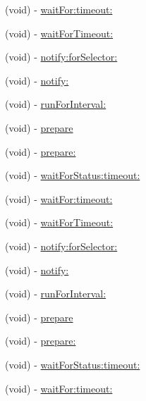 \begin{DoxyCompactItemize}
\item 
(void) -\/ \hyperlink{interface_g_h_async_test_case_a43422127c8303a93f0ae39c883a2da06}{wait\-For\-:timeout\-:}
\item 
(void) -\/ \hyperlink{interface_g_h_async_test_case_aaf22dd45b3493e110362392cc3dc086b}{wait\-For\-Timeout\-:}
\item 
(void) -\/ \hyperlink{interface_g_h_async_test_case_ab1be43eb4f4909ce5607b51fa0a1f40b}{notify\-:for\-Selector\-:}
\item 
(void) -\/ \hyperlink{interface_g_h_async_test_case_ad21d6cdd1f2a284ee7b5ad5b6d1c82e2}{notify\-:}
\item 
(void) -\/ \hyperlink{interface_g_h_async_test_case_accbc972d3d516d1e53529c84fa2fc510}{run\-For\-Interval\-:}
\item 
(void) -\/ \hyperlink{interface_g_h_async_test_case_a8eda5b64c599e0c48bbd206840bd4cde}{prepare}
\item 
(void) -\/ \hyperlink{interface_g_h_async_test_case_a085b47a16f4a790d77ba78bd2eafb3ff}{prepare\-:}
\item 
(void) -\/ \hyperlink{interface_g_h_async_test_case_ae8781529003ebef3a06569c0157687ae}{wait\-For\-Status\-:timeout\-:}
\item 
(void) -\/ \hyperlink{interface_g_h_async_test_case_a43422127c8303a93f0ae39c883a2da06}{wait\-For\-:timeout\-:}
\item 
(void) -\/ \hyperlink{interface_g_h_async_test_case_aaf22dd45b3493e110362392cc3dc086b}{wait\-For\-Timeout\-:}
\item 
(void) -\/ \hyperlink{interface_g_h_async_test_case_ab1be43eb4f4909ce5607b51fa0a1f40b}{notify\-:for\-Selector\-:}
\item 
(void) -\/ \hyperlink{interface_g_h_async_test_case_ad21d6cdd1f2a284ee7b5ad5b6d1c82e2}{notify\-:}
\item 
(void) -\/ \hyperlink{interface_g_h_async_test_case_accbc972d3d516d1e53529c84fa2fc510}{run\-For\-Interval\-:}
\item 
(void) -\/ \hyperlink{interface_g_h_async_test_case_a8eda5b64c599e0c48bbd206840bd4cde}{prepare}
\item 
(void) -\/ \hyperlink{interface_g_h_async_test_case_a085b47a16f4a790d77ba78bd2eafb3ff}{prepare\-:}
\item 
(void) -\/ \hyperlink{interface_g_h_async_test_case_ae8781529003ebef3a06569c0157687ae}{wait\-For\-Status\-:timeout\-:}
\item 
(void) -\/ \hyperlink{interface_g_h_async_test_case_a43422127c8303a93f0ae39c883a2da06}{wait\-For\-:timeout\-:}

\end{DoxyCompactItemize}
